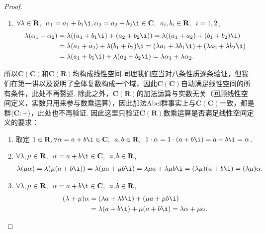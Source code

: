 \begin{proof}
\begin{enumerate}
        \item $\forall \lambda \in \mathbf{R},\enspace \alpha_1 = a_1+b_1\i, \alpha_2 = a_2+b_2\i \in \mathbf{C},\enspace a_i, b_i \in \mathbf{R},\enspace i = 1, 2$,
              \begin{align*}
                  \lambda(\alpha_1+\alpha_2)
                   & = \lambda((a_1+b_1\i)+(a_2+b_2\i)) = \lambda((a_1+a_2)+(b_1+b_2)\i)                             \\
                   & = \lambda(a_1+a_2)+\lambda(b_1+b_2)\i = (\lambda a_1+\lambda b_1\i)+(\lambda a_2+\lambda b_2\i) \\
                   & = \lambda(a_1+b_1\i)+\lambda(a_2+b_2\i) = \lambda \alpha_1 + \lambda \alpha_2.
              \end{align*}
    \end{enumerate}
    所以$\mathbf{C}(\mathbf{C})$和$\mathbf{C}(\mathbf{R})$均构成线性空间.同理我们应当对八条性质逐条验证，但我们在第一讲以及说明了全体复数构成一个域，因此$\mathbf{C}(\mathbf{C})$自动满足线性空间的所有条件，此处不再赘述. 除此之外，$\mathbf{C}(\mathbf{R})$的加法运算与实数无关（回顾线性空间定义，实数只用来参与数乘运算），因此加法Abel群事实上与$\mathbf{C}(\mathbf{C})$一致，都是群$\langle \mathbf{C}:+\rangle$，此处也不再验证. 因此这里只验证$\mathbf{C}(\mathbf{R})$数乘运算是否满足线性空间定义的要求：
    \begin{enumerate}
        \item 取定 $1 \in \mathbf{R}, \forall \alpha = a+b\i \in \mathbf{C},\enspace a, b \in \mathbf{R},\enspace 1 \cdot \alpha = 1 \cdot (a+b\i) = a+b\i = \alpha$.

        \item $\forall \lambda, \mu \in \mathbf{R},\enspace \alpha = a+b\i \in \mathbf{C},\enspace a, b \in \mathbf{R}$,
              \begin{align*}
                  \lambda(\mu \alpha) = \lambda(\mu (a+b\i)) = \lambda(\mu a+\mu b\i) = \lambda \mu a + \lambda \mu b\i = (\lambda \mu)(a+b\i) = (\lambda \mu)\alpha.
              \end{align*}

        \item $\forall \lambda, \mu \in \mathbf{R},\enspace \alpha = a+b\i \in \mathbf{C},\enspace a, b \in \mathbf{R}$,
              \begin{align*}
                  (\lambda + \mu) \alpha
                   & = (\lambda a + \lambda b\i) + (\mu a + \mu b\i)            \\
                   & = \lambda(a+b\i)+\mu(a+b\i) = \lambda \alpha + \mu \alpha.
              \end{align*}


\end{enumerate}
\end{proof}
